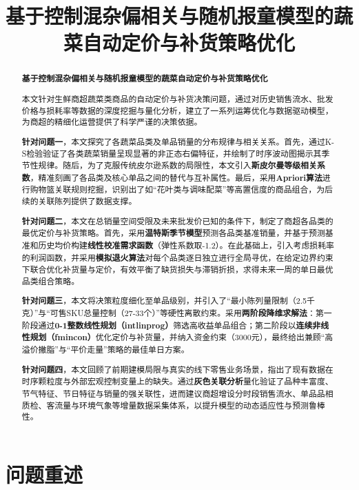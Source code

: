 \documentclass[withoutpreface]{cumcmthesis}
\title{\textbf{\Large 基于控制混杂偏相关与随机报童模型的蔬菜自动定价与补货策略优化}}
\begin{document}
\begin{abstract}
\begin{center}
{\heiti\Large\bfseries 基于控制混杂偏相关与随机报童模型的蔬菜自动定价与补货策略优化}
\end{center}
\vspace{1em}


本文针对生鲜商超蔬菜类商品的自动定价与补货决策问题，通过对历史销售流水、批发价格与损耗率等数据的深度挖掘与量化分析，建立了一系列运筹优化与数据驱动模型，为商超的精细化运营提供了科学严谨的决策依据。

\textbf{针对问题一}，本文探究了各蔬菜品类及单品销量的分布规律与相关关系。首先，通过K-S检验验证了各类蔬菜销量呈现显著的非正态右偏特征，并绘制了时序波动图揭示其季节性规律。随后，为了克服传统皮尔逊系数的局限性，本文引入\textbf{斯皮尔曼等级相关系数}，精准刻画了各品类及核心单品之间的替代与互补属性。最后，采用\textbf{Apriori算法}进行购物篮关联规则挖掘，识别出了如“花叶类与调味配菜”等高置信度的商品组合，为后续的关联陈列提供了数据支撑。

\textbf{针对问题二}，本文在总销量空间受限及未来批发价已知的条件下，制定了商超各品类的最优定价与补货策略。首先，采用\textbf{温特斯季节模型}预测各品类基准销量，并基于预测基准和历史均价构建\textbf{线性校准需求函数}（弹性系数取-1.2）。在此基础上，引入考虑损耗率的利润函数，并采用\textbf{模拟退火算法}对每个品类逐日独立进行全局寻优，在给定边界约束下联合优化补货量与定价，有效平衡了缺货损失与滞销折损，求得未来一周的单日最优品类组合策略。

\textbf{针对问题三}，本文将决策粒度细化至单品级别，并引入了“最小陈列量限制（2.5千克）”与“可售SKU总量控制（27-33个）”等硬性离散约束。采用\textbf{两阶段降维求解法}：第一阶段通过\textbf{0-1整数线性规划（intlinprog）}筛选高收益单品组合；第二阶段以\textbf{连续非线性规划（fmincon）}优化定价与补货量，并纳入资金约束（3000元），最终给出兼顾“高溢价撇脂”与“平价走量”策略的最佳单日方案。

\textbf{针对问题四}，本文回顾了前期建模局限与真实的线下零售业务场景，指出了现有数据在时序颗粒度与外部宏观控制变量上的缺失。通过\textbf{灰色关联分析}量化验证了品种丰富度、节气特征、节日特征与销量的强关联性，进而建议商超增设分时段销售流水、单品品相质检、客流量与环境气象等增量数据采集体系，以提升模型的动态适应性与预测鲁棒性。

\end{abstract}


\section{问题重述}
\end{document}
